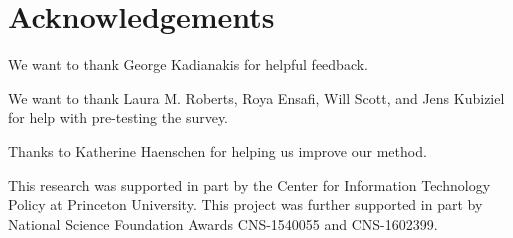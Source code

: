 \section*{Acknowledgements}
We want to thank George Kadianakis for helpful feedback.

We want to thank Laura M. Roberts, Roya Ensafi, Will Scott, and Jens Kubiziel
for help with pre-testing the survey.

Thanks to Katherine Haenschen for helping us improve our method.

This research was supported in part by the Center for Information Technology
Policy at Princeton University.  This project was further supported in part by
National Science Foundation Awards CNS-1540055 and CNS-1602399.
